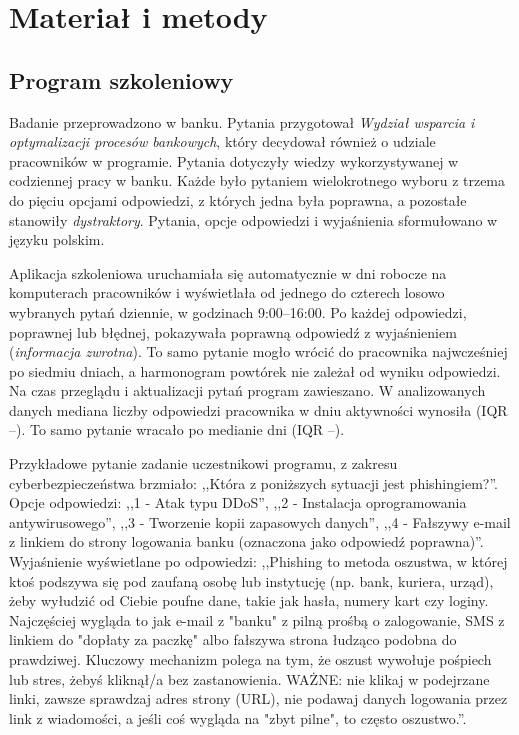 \section{Materiał i metody}

\subsection{Program szkoleniowy}
Badanie przeprowadzono w banku. Pytania przygotował \textit{Wydział wsparcia i optymalizacji procesów
bankowych}, który decydował również o udziale pracowników w programie. Pytania dotyczyły wiedzy
wykorzystywanej w codziennej pracy w banku. Każde było pytaniem wielokrotnego wyboru z trzema do pięciu
opcjami odpowiedzi, z których jedna była poprawna, a pozostałe stanowiły \emph{dystraktory}.
Pytania, opcje odpowiedzi i wyjaśnienia sformułowano w języku polskim. 

Aplikacja szkoleniowa uruchamiała się automatycznie w dni robocze na komputerach pracowników
i wyświetlała od jednego do czterech losowo wybranych pytań dziennie, w godzinach 9:00--16:00.
Po każdej odpowiedzi, poprawnej lub błędnej, pokazywała poprawną odpowiedź z wyjaśnieniem (\emph{informacja zwrotna}). To samo pytanie
mogło wrócić do pracownika najwcześniej po siedmiu dniach, a harmonogram powtórek nie zależał od wyniku
odpowiedzi. Na czas przeglądu i aktualizacji pytań program zawieszano. W analizowanych danych mediana
liczby odpowiedzi pracownika w dniu aktywności wynosiła \DailyMedian{} (IQR \DailyQOne--\DailyQThree).
To samo pytanie wracało po medianie \GapMedian{} dni (IQR \GapQOne--\GapQThree).

Przykładowe pytanie zadanie uczestnikowi programu, z zakresu cyberbezpieczeństwa brzmiało:
,,Która z poniższych sytuacji jest phishingiem?''. Opcje odpowiedzi: 
,,1 - Atak typu DDoS'',
,,2 - Instalacja oprogramowania antywirusowego'',
,,3 - Tworzenie kopii zapasowych danych'',
,,4 - Fałszywy e-mail z linkiem do strony logowania banku (oznaczona jako odpowiedź poprawna)''.
Wyjaśnienie wyświetlane po odpowiedzi:
,,Phishing to metoda oszustwa, w której ktoś podszywa się pod zaufaną osobę lub instytucję (np. bank, kuriera, urząd), żeby wyłudzić od Ciebie poufne dane, takie jak hasła, numery kart czy loginy. Najczęściej wygląda to jak e-mail z "banku" z pilną prośbą o zalogowanie, SMS z linkiem do "dopłaty za paczkę" albo fałszywa strona łudząco podobna do prawdziwej. Kluczowy mechanizm polega na tym, że oszust wywołuje pośpiech lub stres, żebyś kliknął/a bez zastanowienia. WAŻNE: nie klikaj w podejrzane linki, zawsze sprawdzaj adres strony (URL), nie podawaj danych logowania przez link z wiadomości, a jeśli coś wygląda na "zbyt pilne", to często oszustwo.''.

